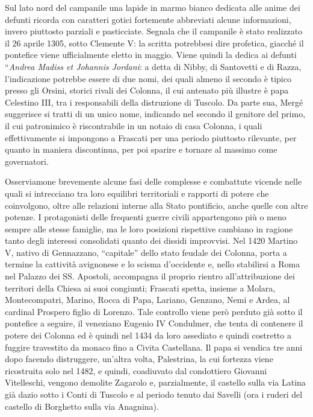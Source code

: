 \documentclass[
  letterpaper,
  DIV=11,
  numbers=noendperiod]{scrartcl}
\begin{document}
Sul lato nord del campanile una lapide in marmo bianco dedicata alle
anime dei defunti ricorda con caratteri gotici fortemente abbreviati
alcune informazioni, invero piuttosto parziali e pasticciate. Segnala
che il campanile è stato realizzato il 26 aprile 1305, sotto Clemente V:
la scritta potrebbesi dire profetica, giacché il pontefice viene
ufficialmente eletto in maggio. Viene quindi la dedica ai defunti
``\emph{Andrea Madiss et Johannis Jordani}: a detta di Nibby, di
Santovetti e di Razza, l'indicazione potrebbe essere di due nomi, dei
quali almeno il secondo è tipico presso gli Orsini, storici rivali dei
Colonna, il cui antenato più illustre è papa Celestino III, tra i
responsabili della distruzione di Tuscolo. Da parte sua, Mergé
suggerisce si tratti di un unico nome, indicando nel secondo il genitore
del primo, il cui patronimico è riscontrabile in un notaio di casa
Colonna, i quali effettivamente si impongono a Frascati per una periodo
piuttosto rilevante, per quanto in maniera discontinua, per poi sparire
e tornare al massimo come governatori.

Osserviamone brevemente alcune fasi delle complesse e combattute vicende
nelle quali si intrecciano tra loro equilibri territoriali e rapporti di
potere che coinvolgono, oltre alle relazioni interne alla Stato
pontificio, anche quelle con altre potenze. I protagonisti delle
frequenti guerre civili appartengono più o meno sempre alle stesse
famiglie, ma le loro posizioni rispettive cambiano in ragione tanto
degli interessi consolidati quanto dei dissidi improvvisi. Nel 1420
Martino V, nativo di Gennazzano, ``capitale'' dello stato feudale dei
Colonna, porta a termine la cattività avignonese e lo scisma d'occidente
e, nello stabilirsi a Roma nel Palazzo dei SS. Apostoli, accompagna il
proprio rientro all'attribuzione dei territori della Chiesa ai suoi
congiunti; Frascati spetta, insieme a Molara, Montecompatri, Marino,
Rocca di Papa, Lariano, Genzano, Nemi e Ardea, al cardinal Prospero
figlio di Lorenzo. Tale controllo viene però perduto già sotto il
pontefice a seguire, il veneziano Eugenio IV Condulmer, che tenta di
contenere il potere dei Colonna ed è quindi nel 1434 da loro assediato e
quindi costretto a fuggire travestito da monaco fino a Civita
Castellana. Il papa si vendica tre anni dopo facendo distruggere,
un'altra volta, Palestrina, la cui fortezza viene ricostruita solo nel
1482, e quindi, coadiuvato dal condottiero Giovanni Vitelleschi, vengono
demolite Zagarolo e, parzialmente, il castello sulla via Latina già
dazio sotto i Conti di Tuscolo e al periodo tenuto dai Savelli (ora i
ruderi del castello di Borghetto sulla via Anagnina).
\end{document}
